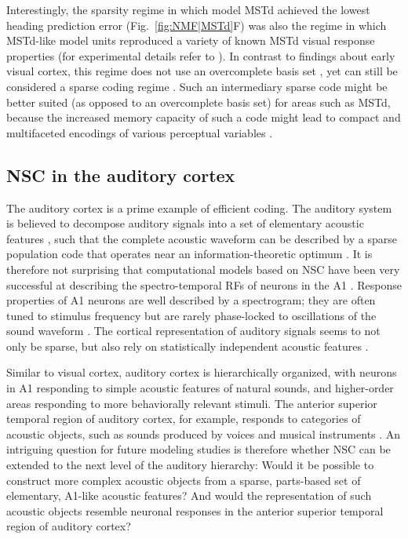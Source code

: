 Interestingly, the sparsity regime in which model \ac{MSTd} achieved the
lowest heading prediction error (Fig.~\ref{fig:NMF|MSTd}F) was also the
regime in which \ac{MSTd}-like model units reproduced a variety of known
\ac{MSTd} visual response properties
(for experimental details refer to \cite{Beyeler2016}).
In contrast to findings about early visual cortex,
this regime does not use an overcomplete basis set \cite{OlshausenField1996},
yet can still be considered a sparse coding regime \cite{SpanneJorntell2015}.
Such an intermediary sparse code might be better suited
(as opposed to an overcomplete basis set)
for areas such as \ac{MSTd},
because the increased memory capacity of such a code might lead to compact
and multifaceted encodings of various perceptual variables
\cite{BenHamed2003}.


\subsection*{NSC in the auditory cortex}

The auditory cortex is a prime example of efficient coding. The auditory system is believed to decompose auditory signals into
a set of elementary acoustic features \cite{SmithLewicki2006},
such that the complete acoustic waveform can be described by a
sparse population code that operates near an information-theoretic optimum
\cite{SmithLewicki2006,rokem2006,Hromadka2008}.
It is therefore not surprising that computational models based on \ac{NSC}
have been very successful at describing the spectro-temporal \acp{RF}
of neurons in the \ac{A1} \cite{Martinez2015,David2007}.
Response properties of \ac{A1} neurons are well described by a spectrogram;
they are often tuned to stimulus frequency but are rarely phase-locked
to oscillations of the sound waveform \cite{Leaver2010}.
The cortical representation of auditory signals seems to not only be sparse,
but also rely on statistically independent acoustic features \cite{Klein2003}.

Similar to visual cortex, auditory cortex is hierarchically organized,
with neurons in \ac{A1} responding to simple acoustic features of natural sounds,
and higher-order areas responding to more behaviorally relevant stimuli.
The anterior superior temporal region of auditory cortex, for example,
responds to categories of acoustic objects,
such as sounds produced by voices and musical instruments
\cite{Leaver2010}.
An intriguing question for future modeling studies is therefore 
whether \ac{NSC} can be extended to the next level of the auditory hierarchy:
Would it be possible to construct more complex acoustic objects from a sparse,
parts-based set of elementary, \ac{A1}-like acoustic features?
And would the representation of such acoustic objects resemble neuronal responses
in the anterior superior temporal region of auditory cortex?


